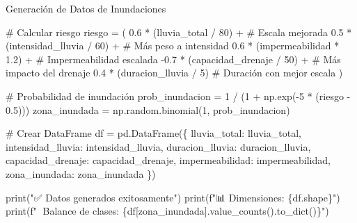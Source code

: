 \documentclass[
  ignorenonframetext,
]{beamer}
\newenvironment{Shaded}{\begin{snugshade}}{\end{snugshade}}
\newcommand{\BuiltInTok}[1]{\textcolor[rgb]{0.00,0.23,0.31}{#1}}
\newcommand{\CommentTok}[1]{\textcolor[rgb]{0.37,0.37,0.37}{#1}}
\newcommand{\DecValTok}[1]{\textcolor[rgb]{0.68,0.00,0.00}{#1}}
\newcommand{\FloatTok}[1]{\textcolor[rgb]{0.68,0.00,0.00}{#1}}
\newcommand{\NormalTok}[1]{\textcolor[rgb]{0.00,0.23,0.31}{#1}}
\newcommand{\OperatorTok}[1]{\textcolor[rgb]{0.37,0.37,0.37}{#1}}
\newcommand{\SpecialCharTok}[1]{\textcolor[rgb]{0.37,0.37,0.37}{#1}}
\newcommand{\SpecialStringTok}[1]{\textcolor[rgb]{0.13,0.47,0.30}{#1}}
\newcommand{\StringTok}[1]{\textcolor[rgb]{0.13,0.47,0.30}{#1}}
\begin{document}
\begin{frame}[fragile]{Generación de Datos de Inundaciones}
\begin{Shaded}
\begin{Highlighting}[]
\CommentTok{\# Calcular riesgo }
\NormalTok{riesgo }\OperatorTok{=}\NormalTok{ (}
    \FloatTok{0.6} \OperatorTok{*}\NormalTok{ (lluvia\_total }\OperatorTok{/} \DecValTok{80}\NormalTok{) }\OperatorTok{+}           \CommentTok{\# Escala mejorada}
    \FloatTok{0.5} \OperatorTok{*}\NormalTok{ (intensidad\_lluvia }\OperatorTok{/} \DecValTok{60}\NormalTok{) }\OperatorTok{+}      \CommentTok{\# Más peso a intensidad}
    \FloatTok{0.6} \OperatorTok{*}\NormalTok{ (impermeabilidad }\OperatorTok{*} \FloatTok{1.2}\NormalTok{) }\OperatorTok{+}       \CommentTok{\# Impermeabilidad escalada}
    \OperatorTok{{-}}\FloatTok{0.7} \OperatorTok{*}\NormalTok{ (capacidad\_drenaje }\OperatorTok{/} \DecValTok{50}\NormalTok{) }\OperatorTok{+}     \CommentTok{\# Más impacto del drenaje}
    \FloatTok{0.4} \OperatorTok{*}\NormalTok{ (duracion\_lluvia }\OperatorTok{/} \DecValTok{5}\NormalTok{)           }\CommentTok{\# Duración con mejor escala}
\NormalTok{)}

\CommentTok{\# Probabilidad de inundación}
\NormalTok{prob\_inundacion }\OperatorTok{=} \DecValTok{1} \OperatorTok{/}\NormalTok{ (}\DecValTok{1} \OperatorTok{+}\NormalTok{ np.exp(}\OperatorTok{{-}}\DecValTok{5} \OperatorTok{*}\NormalTok{ (riesgo }\OperatorTok{{-}} \FloatTok{0.5}\NormalTok{)))}
\NormalTok{zona\_inundada }\OperatorTok{=}\NormalTok{ np.random.binomial(}\DecValTok{1}\NormalTok{, prob\_inundacion)}

\CommentTok{\# Crear DataFrame}
\NormalTok{df }\OperatorTok{=}\NormalTok{ pd.DataFrame(\{}
    \StringTok{\textquotesingle{}lluvia\_total\textquotesingle{}}\NormalTok{: lluvia\_total,}
    \StringTok{\textquotesingle{}intensidad\_lluvia\textquotesingle{}}\NormalTok{: intensidad\_lluvia,}
    \StringTok{\textquotesingle{}duracion\_lluvia\textquotesingle{}}\NormalTok{: duracion\_lluvia,}
    \StringTok{\textquotesingle{}capacidad\_drenaje\textquotesingle{}}\NormalTok{: capacidad\_drenaje,}
    \StringTok{\textquotesingle{}impermeabilidad\textquotesingle{}}\NormalTok{: impermeabilidad,}
    \StringTok{\textquotesingle{}zona\_inundada\textquotesingle{}}\NormalTok{: zona\_inundada}
\NormalTok{\})}

\BuiltInTok{print}\NormalTok{(}\StringTok{"✅ Datos generados exitosamente"}\NormalTok{)}
\BuiltInTok{print}\NormalTok{(}\SpecialStringTok{f"📊 Dimensiones: }\SpecialCharTok{\{}\NormalTok{df}\SpecialCharTok{.}\NormalTok{shape}\SpecialCharTok{\}}\SpecialStringTok{"}\NormalTok{)}
\BuiltInTok{print}\NormalTok{(}\SpecialStringTok{f"🎯 Balance de clases: }\SpecialCharTok{\{}\NormalTok{df[}\StringTok{\textquotesingle{}zona\_inundada\textquotesingle{}}\NormalTok{]}\SpecialCharTok{.}\NormalTok{value\_counts()}\SpecialCharTok{.}\NormalTok{to\_dict()}\SpecialCharTok{\}}\SpecialStringTok{"}\NormalTok{)}
\end{Highlighting}
\end{Shaded}


\end{frame}
\end{document}
